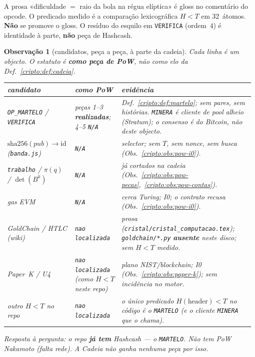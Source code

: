 \documentclass[11pt,a4paper]{article}
\newcommand{\code}[1]{\texttt{\small #1}}
\newtheorem{observacao}[teorema]{Observação}
\begin{document}
\noindent
A prosa «dificuldade $=$ raio da bola na régua elíptica»
é gloss no comentário do opcode.
O predicado medido é a comparação lexicográfica
$H<T$ em 32~átomos.
\textbf{Não} se promove o gloss.
O resíduo do esquilo em \code{VERIFICA} (ordem~$4$)
é identidade à parte, \textbf{não} peça de Hashcash.

\begin{observacao}[candidatos, peça a peça, à parte da cadeia]\label{cripto:obs:pow-candidatos}
Cada linha é um objecto.
O estatuto é \textbf{como peça de PoW},
não como elo da Def.~\ref{cripto:def:cadeia}.

\begin{center}\small
\begin{tabular}{@{}p{}p{}p{}@{}}
\toprule
candidato & como PoW & evidência \\
\midrule
\code{OP\_MARTELO} / \code{VERIFICA}
  & peças 1--3 \textbf{realizadas};
    4--5 \texttt{N/A}
  & Def.~\ref{cripto:def:martelo};
    sem pares, sem histórias.
    \code{MINERA} é cliente de pool alheio
    (Stratum); o consenso é do Bitcoin,
    não deste objecto. \\
$\mathrm{sha256}(\mathit{pub})\to\mathrm{id}$
  (\code{banda.js})
  & \texttt{N/A}
  & selector; sem $T$, sem nonce, sem busca
    (Obs.~\ref{cripto:obs:pow-i0}). \\
\texttt{trabalho} / $\pi(q)$ / $\det(B^{k})$
  & \texttt{N/A}
  & já cortados na cadeia
    (Obs.~\ref{cripto:obs:pow-pecas},~\ref{cripto:obs:pow-contas}). \\
gas EVM
  & \texttt{N/A}
  & cerca Turing; I0; o contrato recusa
    (Obs.~\ref{cripto:obs:pow-i0}). \\
GoldChain / HTLC (wiki)
  & \texttt{nao localizada}
  & prosa (\code{cristal/cristal\_computacao.tex});
    \code{goldchain/*.py} \textbf{ausente} neste disco;
    sem $H<T$ medido. \\
Paper~K / U4
  & \texttt{nao localizada}
    (como $H<T$ neste repo)
  & plano NIST/blockchain; I0
    (Obs.~\ref{cripto:obs:paper-k});
    sem incidência no motor. \\
outro $H<T$ no repo
  & \texttt{nao localizada}
  & o único predicado $H(\mathrm{header})<T$
    no código é o \code{MARTELO}
    (e o cliente \code{MINERA} que o chama). \\
\bottomrule
\end{tabular}
\end{center}

Resposta à pergunta:
o repo \textbf{já tem} Hashcash --- o \code{MARTELO}.
Não tem PoW Nakamoto (falta rede).
A Cadeia não ganha nenhuma peça por isso.
\end{observacao}
\end{document}
